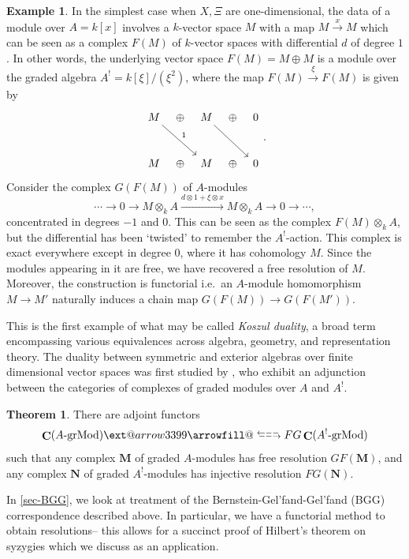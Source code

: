 \documentclass[a4paper]{article}
\makeatletter
\theoremstyle{definition}
\newtheorem*{theorem*}{Theorem}
\newtheorem{example}[defn]{Example}
\theoremstyle{remark}
\newcommand{\leftrarrows}{\mathrel{\raise.75ex\hbox{\oalign{%
  $\scriptstyle\leftarrow$\cr
  \vrule width0pt height.5ex$\hfil\scriptstyle\relbar$\cr}}}}
\newcommand{\lrightarrows}{\mathrel{\raise.75ex\hbox{\oalign{%
  $\scriptstyle\relbar$\hfil\cr
  $\scriptstyle\vrule width0pt height.5ex\smash\rightarrow$\cr}}}}
\newcommand{\Rrelbar}{\mathrel{\raise.75ex\hbox{\oalign{%
  $\scriptstyle\relbar$\cr
  \vrule width0pt height.5ex$\scriptstyle\relbar$}}}}
\def\leftrightarrowsfill@{\arrowfill@\leftrarrows\Rrelbar\lrightarrows}
\newcommand{\xleftrightarrows}[2][]{\ext@arrow 3399\leftrightarrowsfill@{#1}{#2}}
\newcommand{\grMod}{\ensuremath{\text{-grMod}}}
\DeclareMathOperator{\Ch}{\mathbf{C}}
\makeatother
\begin{document}
\begin{example}\label{setstage}
In the simplest case when \(X, \Xi\) are one-dimensional, the data of a module
over \(A = k[x]\) involves a \(k\)-vector space \(M\) with a map
\(M\xrightarrow{x} M\) which can be seen as a complex \(F(M)\) of
\(k\)-vector spaces with differential \(d\) of degree \(1\). In other words, the
underlying vector space \(F(M) = M\oplus M\) is a module over the graded algebra
\(A^! = k[\xi]/(\xi^2)\), where the map \(F(M)\xrightarrow{\xi} F(M)\) is given by
\[\begin{tikzcd}[column sep = tiny, row sep = large]
    M \arrow[rrd, "1"] & \oplus &  M \arrow[rrd] & \oplus & 0\\ 
    M & \oplus & M & \oplus & 0 
\end{tikzcd}.\]
Consider the complex \(G(F(M))\) of \(A\)-modules
\[\cdots \rightarrow 0 \rightarrow M\otimes_k A
\xrightarrow{ d\otimes 1 + \xi \otimes x} M\otimes_k A \rightarrow 0 \rightarrow
\cdots ,\]
concentrated in degrees \(-1\) and \(0\). This can be seen as the complex \(F(M)\otimes_k A\), but the differential has been
`twisted' to remember the \(A^!\)-action. This complex is exact everywhere
except in degree \(0\), where it has cohomology \(M\). Since the modules
appearing in it are free, we have recovered a free resolution of \(M\).
Moreover, the construction is functorial i.e.\ an \(A\)-module homomorphism
\(M\rightarrow M'\) naturally induces a chain map \(G(F(M))\rightarrow
G(F(M'))\). 
\end{example}

This is the first example of what may be called \textit{Koszul duality}, a broad
term encompassing various equivalences across algebra, geometry, and representation
theory. The duality between symmetric and exterior algebras over finite
dimensional vector spaces was first studied by
, who exhibit an adjunction between the
categories of complexes of graded modules over \(A\) and \(A^!\).  
\begin{theorem*}
    There are adjoint functors
    \[ \Ch(A\grMod) \xleftrightarrows[F]{G} \Ch(A^!\grMod)\]
    such that any complex \(\mathbf{M}\) of graded
    \(A\)-modules has free resolution \(GF(\mathbf{M})\), and any complex
    \(\mathbf{N}\) of graded \(A^!\)-modules has injective resolution
    \(FG(\mathbf{N})\). 
\end{theorem*}
In \cref{sec-BGG}, we look at 
treatment of the Bernstein-Gel'fand-Gel'fand (BGG) correspondence described
above. In particular, we have a functorial method to obtain resolutions-- this
allows for a succinct proof of Hilbert's theorem on syzygies which we discuss as an
application. 
\end{document}
